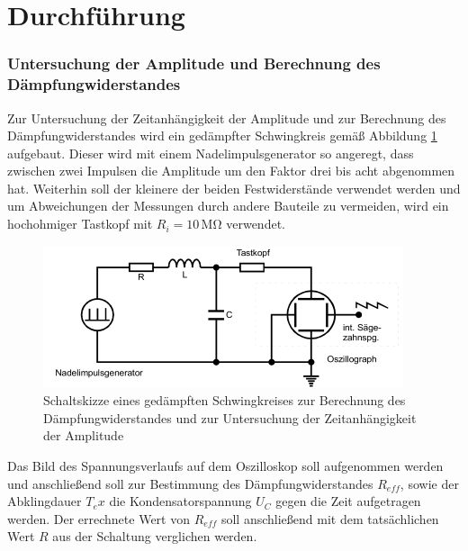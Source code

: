 \section{Durchführung}
\label{sec:Durchführung}

\subsubsection{Untersuchung der Amplitude und Berechnung des Dämpfungwiderstandes}

Zur Untersuchung der Zeitanhängigkeit der Amplitude und zur Berechnung des Dämpfungwiderstandes
wird ein gedämpfter Schwingkreis gemäß Abbildung \ref{fig:gsk2} aufgebaut. Dieser wird mit einem
Nadelimpulsgenerator so angeregt, dass zwischen zwei Impulsen die Amplitude um den Faktor drei 
bis acht abgenommen hat. Weiterhin soll der kleinere der beiden Festwiderstände verwendet werden
und um Abweichungen der Messungen durch andere Bauteile zu vermeiden, wird ein hochohmiger 
Tastkopf mit $R_i = 10\, \si{\mega\ohm}$ verwendet.

\begin{figure}[H]
  \centering
  \includegraphics{content/aufgabeA.png}
  \caption{Schaltskizze eines gedämpften Schwingkreises zur Berechnung des Dämpfungwiderstandes und zur Untersuchung der Zeitanhängigkeit der Amplitude}
  \label{fig:gsk2}
\end{figure}

Das Bild des Spannungsverlaufs auf dem Oszilloskop soll aufgenommen werden und anschließend soll
zur Bestimmung des Dämpfungwiderstandes $R_{eff}$, sowie der Abklingdauer $T_ex$ die Kondensatorspannung
$U_C$ gegen die Zeit aufgetragen werden. Der errechnete Wert von $R_{eff}$ soll anschließend mit dem
tatsächlichen Wert $R$ aus der Schaltung verglichen werden.


